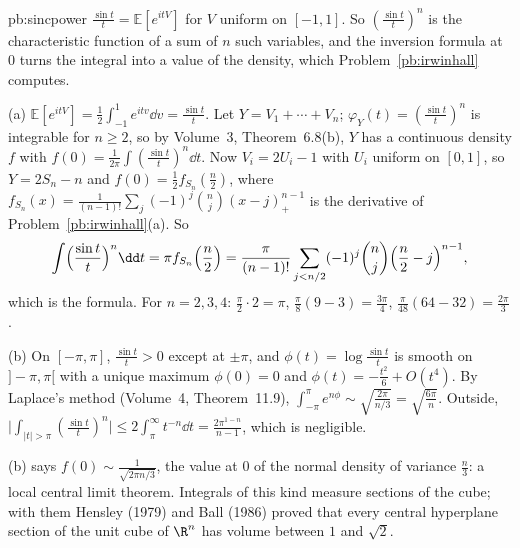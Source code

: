 \begin{solution}{pb:sincpower}
\idea $\frac{\sin t}t=\mathbb E[e^{itV}]$ for $V$ uniform on $[-1,1]$. So $(\frac{\sin t}t)^n$ is the characteristic function of a sum of $n$ such
variables, and the inversion formula at $0$ turns the integral into a value of the density, which Problem~\ref{pb:irwinhall} computes.

\writeup (a) $\mathbb E[e^{itV}]=\frac12\int_{-1}^1e^{itv}\dd v=\frac{\sin t}t$. Let $Y=V_1+\cdots+V_n$; $\varphi_Y(t)=(\frac{\sin t}t)^n$ is integrable for $n\ge2$, so by
Volume~3, Theorem~6.8(b), $Y$ has a continuous density $f$ with $f(0)=\frac1{2\pi}\int(\frac{\sin t}t)^n\dd t$. Now $V_i=2U_i-1$ with $U_i$ uniform on $[0,1]$,
so $Y=2S_n-n$ and $f(0)=\frac12f_{S_n}(\frac n2)$, where $f_{S_n}(x)=\frac1{(n-1)!}\sum_j(-1)^j\binom nj(x-j)_+^{n-1}$ is the derivative of Problem~\ref{pb:irwinhall}(a). So
\[
\int\Bigl(\frac{\sin t}t\Bigr)^n\dd t=\pi f_{S_n}\Bigl(\frac n2\Bigr)=\frac\pi{(n-1)!}\sum_{j<n/2}(-1)^j\binom nj\Bigl(\frac n2-j\Bigr)^{n-1},
\]
which is the formula. For $n=2,3,4$: $\frac\pi{2}\cdot2=\pi$, $\frac\pi{8}(9-3)=\frac{3\pi}4$, $\frac\pi{48}(64-32)=\frac{2\pi}3$.

(b) On $[-\pi,\pi]$, $\frac{\sin t}t>0$ except at $\pm\pi$, and $\phi(t)=\log\frac{\sin t}t$ is smooth on $]-\pi,\pi[$ with a unique maximum $\phi(0)=0$ and
$\phi(t)=-\frac{t^2}6+O(t^4)$. By Laplace's method (Volume~4, Theorem~11.9), $\int_{-\pi}^\pi e^{n\phi}\sim\sqrt{\frac{2\pi}{n/3}}=\sqrt{\frac{6\pi}n}$. Outside,
$\bigl|\int_{|t|>\pi}(\frac{\sin t}t)^n\bigr|\le2\int_\pi^\infty t^{-n}\dd t=\frac{2\pi^{1-n}}{n-1}$, which is negligible.

\leads (b) says $f(0)\sim\frac1{\sqrt{2\pi n/3}}$, the value at $0$ of the normal density of variance $\frac n3$: a local central limit theorem.
Integrals of this kind measure sections of the cube; with them Hensley (1979) and Ball (1986) proved that every central hyperplane
section of the unit cube of $\R^n$ has volume between $1$ and $\sqrt2$.
\end{solution}

